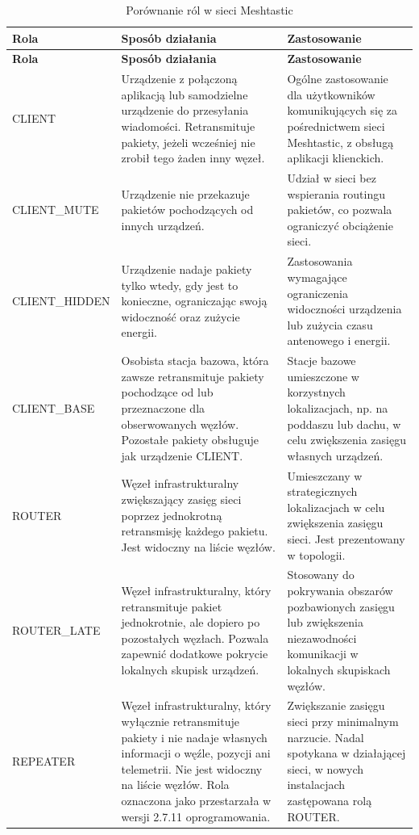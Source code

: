 \documentclass[12pt,a4paper,twoside]{report}
\theoremstyle{definition} %
\begin{document}
\begin{longtable}{|p{3.6cm}|p{5.2cm}|p{5.2cm}|}
\caption{Porównanie ról w sieci Meshtastic \cite{meshtastic_device}}
    \label{tabela1}\\
    \hline
    \textbf{Rola} & \textbf{Sposób działania} & \textbf{Zastosowanie} \\
    \hline
    \endfirsthead
    \hline
    \textbf{Rola} & \textbf{Sposób działania} & \textbf{Zastosowanie} \\
    \hline
    \endhead
    CLIENT &
    Urządzenie z połączoną aplikacją lub samodzielne urządzenie do przesyłania wiadomości. Retransmituje pakiety, jeżeli wcześniej nie zrobił tego żaden inny węzeł. &
    Ogólne zastosowanie dla użytkowników komunikujących się za pośrednictwem sieci Meshtastic, z obsługą aplikacji klienckich. \\
    \hline
    CLIENT\_MUTE &
    Urządzenie nie przekazuje pakietów pochodzących od innych urządzeń. &
    Udział w sieci bez wspierania routingu pakietów, co pozwala ograniczyć obciążenie sieci. \\
    \hline
    CLIENT\_HIDDEN &
    Urządzenie nadaje pakiety tylko wtedy, gdy jest to konieczne, ograniczając swoją widoczność oraz zużycie energii. &
    Zastosowania wymagające ograniczenia widoczności urządzenia lub zużycia czasu antenowego i energii. \\
    \hline
    CLIENT\_BASE &
    Osobista stacja bazowa, która zawsze retransmituje pakiety pochodzące od lub przeznaczone dla obserwowanych węzłów. Pozostałe pakiety obsługuje jak urządzenie CLIENT. &
    Stacje bazowe umieszczone w korzystnych lokalizacjach, np. na poddaszu lub dachu, w celu zwiększenia zasięgu własnych urządzeń. \\
    \hline
    ROUTER &
    Węzeł infrastrukturalny zwiększający zasięg sieci poprzez jednokrotną retransmisję każdego pakietu. Jest widoczny na liście węzłów. &
    Umieszczany w strategicznych lokalizacjach w celu zwiększenia zasięgu sieci. Jest prezentowany w topologii. \\
    \hline
    ROUTER\_LATE &
    Węzeł infrastrukturalny, który retransmituje pakiet jednokrotnie, ale dopiero po pozostałych węzłach. Pozwala zapewnić dodatkowe pokrycie lokalnych skupisk urządzeń. &
    Stosowany do pokrywania obszarów pozbawionych zasięgu lub zwiększenia niezawodności komunikacji w lokalnych skupiskach węzłów. \\
    \hline
    REPEATER &
    Węzeł infrastrukturalny, który wyłącznie retransmituje pakiety i nie nadaje własnych informacji o węźle, pozycji ani telemetrii. Nie jest widoczny na liście węzłów. Rola oznaczona jako przestarzała w wersji 2.7.11 oprogramowania. &
    Zwiększanie zasięgu sieci przy minimalnym narzucie. Nadal spotykana w działającej sieci, w nowych instalacjach zastępowana rolą ROUTER. \\
    \hline
\end{longtable}
\end{document}
